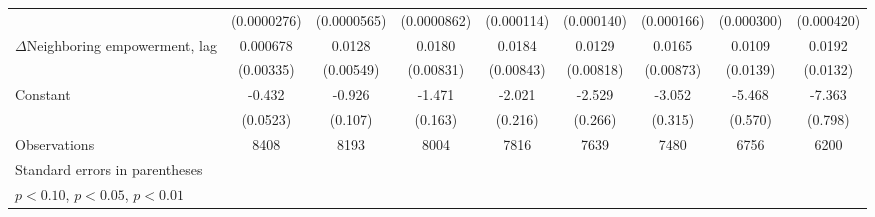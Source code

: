 \begin{table}[htbp]
\begin{tabular}{l*{8}{c}}
                    & (0.0000276)         & (0.0000565)         & (0.0000862)         &  (0.000114)         &  (0.000140)         &  (0.000166)         &  (0.000300)         &  (0.000420)         \\
[1em]
$\Delta$Neighboring empowerment, lag&    0.000678         &      0.0128\sym{**} &      0.0180\sym{**} &      0.0184\sym{**} &      0.0129         &      0.0165\sym{*}  &      0.0109         &      0.0192         \\
                    &   (0.00335)         &   (0.00549)         &   (0.00831)         &   (0.00843)         &   (0.00818)         &   (0.00873)         &    (0.0139)         &    (0.0132)         \\
[1em]
Constant            &      -0.432\sym{***}&      -0.926\sym{***}&      -1.471\sym{***}&      -2.021\sym{***}&      -2.529\sym{***}&      -3.052\sym{***}&      -5.468\sym{***}&      -7.363\sym{***}\\
                    &    (0.0523)         &     (0.107)         &     (0.163)         &     (0.216)         &     (0.266)         &     (0.315)         &     (0.570)         &     (0.798)         \\
\hline
Observations        &        8408         &        8193         &        8004         &        7816         &        7639         &        7480         &        6756         &        6200         \\
\hline\hline
\multicolumn{9}{l}{\footnotesize Standard errors in parentheses}\\
\multicolumn{9}{l}{\footnotesize \sym{*} \(p<0.10\), \sym{**} \(p<0.05\), \sym{***} \(p<0.01\)}\\
\end{tabular}
\end{table}
